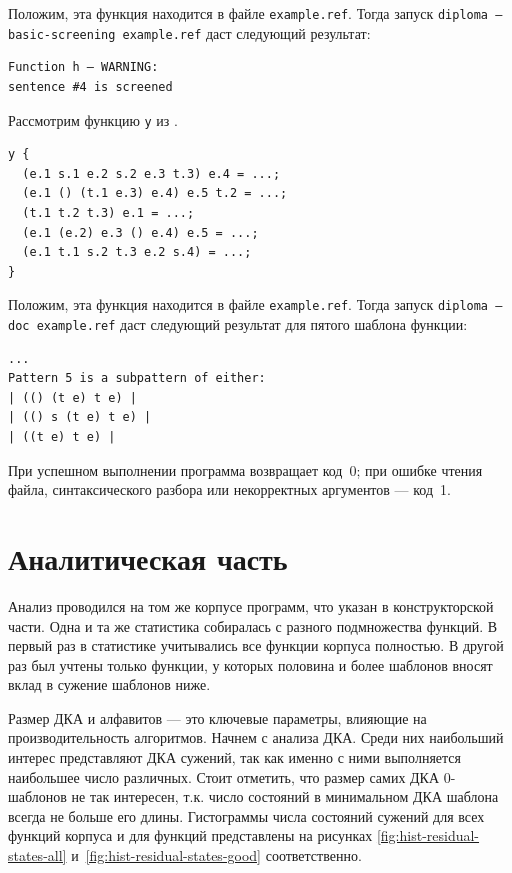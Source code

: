 Положим, эта функция находится в файле \texttt{example.ref}.
Тогда запуск \texttt{diploma --basic-screening example.ref} даст следующий результат:
\begin{verbatim}
Function h — WARNING:
sentence #4 is screened
\end{verbatim}

Рассмотрим функцию \texttt{y} из .

\begin{listing}[H]
\caption{Пример функции с нетривиальным сужением последнего шаблона}
\label{lst:doc-example}
\begin{verbatim}
y {
  (e.1 s.1 e.2 s.2 e.3 t.3) e.4 = ...;
  (e.1 () (t.1 e.3) e.4) e.5 t.2 = ...;
  (t.1 t.2 t.3) e.1 = ...;
  (e.1 (e.2) e.3 () e.4) e.5 = ...;
  (e.1 t.1 s.2 t.3 e.2 s.4) = ...;
}

\end{verbatim}
\end{listing}


Положим, эта функция находится в файле \texttt{example.ref}.
Тогда запуск \texttt{diploma --doc example.ref} даст следующий результат для пятого 
шаблона функции:
\begin{verbatim}
...
Pattern 5 is a subpattern of either:
| (() (t e) t e) |
| (() s (t e) t e) |
| ((t e) t e) |
\end{verbatim}

При успешном выполнении программа возвращает код~0; при ошибке чтения файла, синтаксического разбора или некорректных аргументов --- код~1.

\section{Аналитическая часть}

Анализ проводился на том же корпусе программ, что указан в конструкторской части. 
Одна и та же статистика собиралась с разного подмножества функций. В первый раз в статистике 
учитывались все функции корпуса полностью. В другой раз был учтены только  
функции, у которых половина и более шаблонов вносят вклад в сужение шаблонов ниже.

Размер ДКА и алфавитов --- это ключевые параметры, влияющие на производительность алгоритмов.
Начнем с анализа ДКА. Среди них наибольший интерес представляют ДКА сужений, так как именно с 
ними выполняется наибольшее число различных. Стоит отметить, что размер самих ДКА 0-шаблонов 
не так интересен, т.к. число состояний в минимальном ДКА шаблона всегда не больше его длины. 
Гистограммы числа состояний сужений для всех функций корпуса и для  функций 
представлены на рисунках \ref{fig:hist-residual-states-all} и~\ref{fig:hist-residual-states-good} соответственно.

